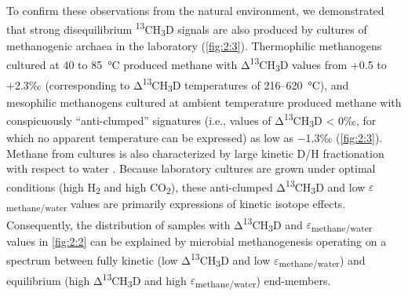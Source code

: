 To confirm these observations from the natural environment, we
demonstrated that strong disequilibrium
\textsuperscript{13}CH\textsubscript{3}D signals are also produced by
cultures of methanogenic archaea in the laboratory (\autoref{fig:2:3}).
Thermophilic methanogens cultured at 40 to 85~°C produced methane with
Δ\textsuperscript{13}CH\textsubscript{3}D values from +0.5 to +2.3‰
(corresponding to Δ\textsuperscript{13}CH\textsubscript{3}D temperatures
of 216--620~°C), and mesophilic methanogens cultured at ambient
temperature produced methane with conspicuously ``anti-clumped''
signatures (i.e., values of Δ\textsuperscript{13}CH\textsubscript{3}D
\textless{} 0‰, for which no apparent temperature can be expressed) as
low as $-$1.3‰ (\autoref{fig:2:3}). Methane from cultures is also characterized by
large kinetic D/H fractionation with respect to water \parencite{Valentine++_2004_GCA,Balabane++_1987_OG}. Because laboratory cultures are grown under optimal
conditions (high H\textsubscript{2} and high CO\textsubscript{2}), these
anti-clumped Δ\textsuperscript{13}CH\textsubscript{3}D and low
$\varepsilon$\textsubscript{methane/water} values are primarily expressions of
kinetic isotope effects. Consequently, the distribution of samples with
Δ\textsuperscript{13}CH\textsubscript{3}D and
$\varepsilon$\textsubscript{methane/water} values in \autoref{fig:2:2} can be explained by
microbial methanogenesis operating on a spectrum between fully kinetic
(low Δ\textsuperscript{13}CH\textsubscript{3}D and low
$\varepsilon$\textsubscript{methane/water}) and equilibrium (high
Δ\textsuperscript{13}CH\textsubscript{3}D and high
$\varepsilon$\textsubscript{methane/water}) end-members.

